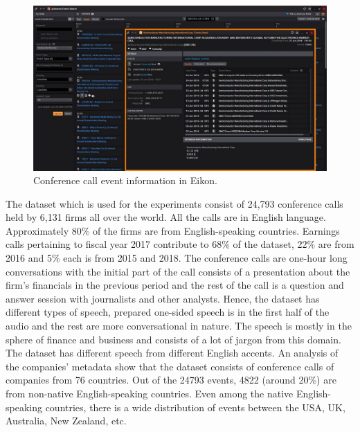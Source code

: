 \begin{figure}[ht]
  \begin{center}
    \includegraphics[width=\textwidth]{images/company-events-coverage-eikon.jpg} 
    \caption{Conference call event information in Eikon.}
    \label{fig:eikon}
  \end{center}
\end{figure}

The dataset which is used for the experiments consist of 24,793 conference calls held by 6,131 firms all over the world. All the calls are in English language. Approximately 80\% of the firms are from English-speaking countries. Earnings calls pertaining to fiscal year 2017 contribute to 68\% of the dataset, 22\% are from 2016 and 5\% each is from 2015 and 2018. 
The conference calls are one-hour long conversations with the initial part of the call consists of a presentation about the firm's financials in the previous period and the rest of the call is a question and answer session with journalists and other analysts. Hence, the dataset has different types of speech, prepared one-sided speech is in the first half of the audio and the rest are more conversational in nature. The speech is mostly in the sphere of finance and business and consists of a lot of jargon from this domain. The dataset has different speech from different English accents. An analysis of the companies' metadata show that the dataset consists of conference calls of companies from 76 countries. Out of the 24793 events, 4822 (around 20\%) are from non-native English-speaking countries. Even among the native English-speaking countries, there is a wide distribution of events between the USA, UK, Australia, New Zealand, etc.

